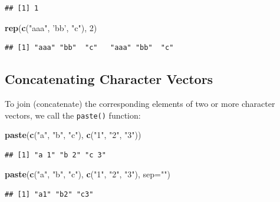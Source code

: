 \documentclass[10pt,b5paper,krantz1]{krantz}
\newenvironment{Shaded}{\begin{snugshade}}{\end{snugshade}}
\newcommand{\DataTypeTok}[1]{\textcolor[rgb]{0.27,0.27,0.27}{#1}}
\newcommand{\DecValTok}[1]{\textcolor[rgb]{0.06,0.06,0.06}{#1}}
\newcommand{\KeywordTok}[1]{\textcolor[rgb]{0.27,0.27,0.27}{\textbf{#1}}}
\newcommand{\NormalTok}[1]{#1}
\newcommand{\StringTok}[1]{\textcolor[rgb]{0.5,0.5,0.5}{#1}}
\begin{document}
\begin{verbatim}
## [1] 1
\end{verbatim}

\begin{Shaded}
\begin{Highlighting}[]
\KeywordTok{rep}\NormalTok{(}\KeywordTok{c}\NormalTok{(}\StringTok{"aaa"}\NormalTok{, }\StringTok{'bb'}\NormalTok{, }\StringTok{"c"}\NormalTok{), }\DecValTok{2}\NormalTok{)}
\end{Highlighting}
\end{Shaded}

\begin{verbatim}
## [1] "aaa" "bb"  "c"   "aaa" "bb"  "c"
\end{verbatim}

\hypertarget{concatenating-character-vectors}{%
\subsection{Concatenating Character Vectors}\label{concatenating-character-vectors}}

To join (concatenate) the corresponding elements of two or more character vectors,
we call the \texttt{paste()} function:

\begin{Shaded}
\begin{Highlighting}[]
\KeywordTok{paste}\NormalTok{(}\KeywordTok{c}\NormalTok{(}\StringTok{"a"}\NormalTok{, }\StringTok{"b"}\NormalTok{, }\StringTok{"c"}\NormalTok{), }\KeywordTok{c}\NormalTok{(}\StringTok{"1"}\NormalTok{, }\StringTok{"2"}\NormalTok{, }\StringTok{"3"}\NormalTok{))}
\end{Highlighting}
\end{Shaded}

\begin{verbatim}
## [1] "a 1" "b 2" "c 3"
\end{verbatim}

\begin{Shaded}
\begin{Highlighting}[]
\KeywordTok{paste}\NormalTok{(}\KeywordTok{c}\NormalTok{(}\StringTok{"a"}\NormalTok{, }\StringTok{"b"}\NormalTok{, }\StringTok{"c"}\NormalTok{), }\KeywordTok{c}\NormalTok{(}\StringTok{"1"}\NormalTok{, }\StringTok{"2"}\NormalTok{, }\StringTok{"3"}\NormalTok{), }\DataTypeTok{sep=}\StringTok{""}\NormalTok{)}
\end{Highlighting}
\end{Shaded}

\begin{verbatim}
## [1] "a1" "b2" "c3"
\end{verbatim}
\end{document}

